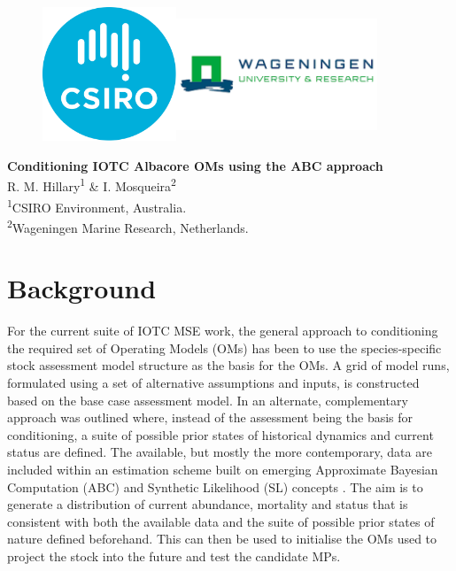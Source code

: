 \documentclass[11pt]{article}
\begin{document}

\begin{figure}[ht]
    \includegraphics[width=4cm,height=4cm]{CSIRO.png}\hspace{0.75in}\includegraphics[width=6cm,height=4cm]{UWag.png}
\end{figure}

\vspace{0.5in}
\begin{center}
{\Large\textbf{Conditioning IOTC Albacore OMs using the
ABC approach}}\\
\vspace*{0.5in}
    R. M. Hillary\textsuperscript{1} \& I. Mosqueira\textsuperscript{2}\\
    \vspace{0.5in}
\textsuperscript{1}CSIRO Environment, Australia.\\
\textsuperscript{2}Wageningen Marine Research, Netherlands.
\end{center}

\newpage
\section{Background}

For the current suite of IOTC MSE work, the general approach to conditioning the required set of Operating Models (OMs) has been to use the species-specific stock assessment model structure as the basis for the OMs. A grid of model runs, formulated using a set of alternative assumptions and inputs, is constructed based on the base case assessment model. In \cite{om21} an alternate, complementary approach was outlined where, instead of the assessment being the basis for conditioning, a suite of possible prior states of historical dynamics and current status are defined. The available, but mostly the more contemporary, data are included within an estimation scheme built on emerging Approximate Bayesian Computation (ABC) and Synthetic Likelihood (SL) concepts \cite{abc,synlkhd}. The aim is to generate a distribution of current abundance, mortality and status that is consistent with both the available data and the suite of possible prior states of nature defined beforehand. This can then be used to initialise the OMs used to project the stock into the future and test the candidate MPs.
\end{document}
